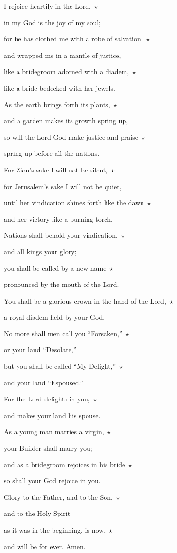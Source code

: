 \noindent I rejoice heartily in the Lord,~$\star$~\nopagebreak

in my God is the joy of my soul;

\noindent for he has clothed me with a robe of salvation,~$\star$~\nopagebreak

and wrapped me in a mantle of justice,

\noindent like a bridegroom adorned with a diadem,~$\star$~\nopagebreak

like a bride bedecked with her jewels.

\noindent As the earth brings forth its plants,~$\star$~\nopagebreak

and a garden makes its growth spring up,

\noindent so will the Lord God make justice and praise~$\star$~\nopagebreak

spring up before all the nations.

\noindent For Zion’s sake I will not be silent,~$\star$~\nopagebreak

for Jerusalem’s sake I will not be quiet,

\noindent until her vindication shines forth like the dawn~$\star$~\nopagebreak

and her victory like a burning torch.

\noindent Nations shall behold your vindication,~$\star$~\nopagebreak

and all kings your glory;

\noindent you shall be called by a new name~$\star$~\nopagebreak

pronounced by the mouth of the Lord.

\noindent You shall be a glorious crown in the hand of the Lord,~$\star$~\nopagebreak

a royal diadem held by your God.

\noindent No more shall men call you “Forsaken,”~$\star$~\nopagebreak

or your land “Desolate,”

\noindent but you shall be called “My Delight,”~$\star$~\nopagebreak

and your land “Espoused.”

\noindent For the Lord delights in you,~$\star$~\nopagebreak

and makes your land his spouse.

\noindent As a young man marries a virgin,~$\star$~\nopagebreak

your Builder shall marry you;

\noindent and as a bridegroom rejoices in his bride~$\star$~\nopagebreak

so shall your God rejoice in you.

\noindent Glory to the Father, and to the Son,~$\star$~\nopagebreak

and to the Holy Spirit:

\noindent as it was in the beginning, is now,~$\star$~\nopagebreak

and will be for ever. Amen.